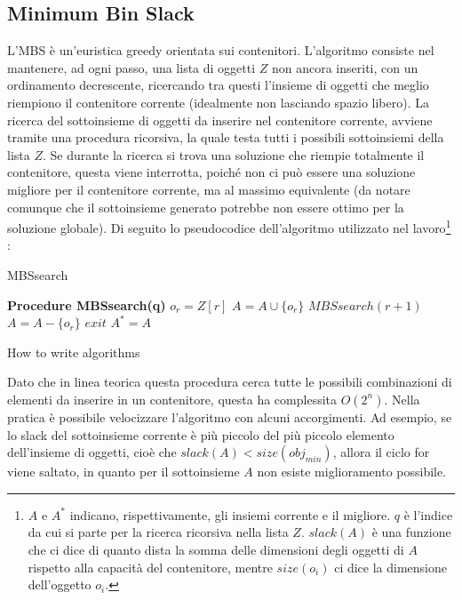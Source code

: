 \documentclass{article}
\begin{document}
\subsection{Minimum Bin Slack}
L'MBS è un'euristica greedy orientata sui contenitori. L'algoritmo consiste nel mantenere, ad ogni passo, una lista di oggetti $Z$ non ancora inseriti, con un ordinamento decrescente, ricercando tra questi l'insieme di oggetti che meglio riempiono il contenitore corrente (idealmente non lasciando spazio libero).
\newline
\newline
La ricerca del sottoinsieme di oggetti da inserire nel contenitore corrente, avviene tramite una procedura ricorsiva, la quale testa tutti i possibili sottoinsiemi della lista $Z$. Se durante la ricerca si trova una soluzione che riempie totalmente il contenitore, questa viene interrotta, poiché non ci può essere una soluzione migliore per il contenitore corrente, ma al massimo equivalente (da notare comunque che il sottoinsieme generato potrebbe non essere ottimo per la soluzione globale). 
\newpage
Di seguito lo pseudocodice dell'algoritmo utilizzato nel lavoro\footnote{$A$ e $A^*$ indicano, rispettivamente, gli insiemi corrente e il migliore. $q$ è l'indice da cui si parte per la ricerca ricorsiva nella lista $Z$. $slack(A)$ è una funzione che ci dice di quanto dista la somma delle dimensioni degli oggetti di $A$ rispetto alla capacità del contenitore, mentre $size(o_i)$ ci dice la dimensione dell'oggetto $o_i$.} :
\begin{algorithm}[h]
\caption{MBSsearch}
\label{MBSsearch}
\begin{algorithmic}[2]
\State \textbf{Procedure MBSsearch(q)}
\State $o_{r} = Z[r]$
\State $A = A \cup \{o_{r}\}$
\State $MBSsearch(r+1)$
\State $A = A - \{o_{r}\}$
\State $exit$
\EndIf
{}
\EndIf 
{}
\EndFor
{}
\State $A^* = A$
\EndIf
{}
\caption{How to write algorithms}
\end{algorithmic}
\end{algorithm}
\newline
\newline
Dato che in linea teorica questa procedura cerca tutte le possibili combinazioni di elementi da inserire in un contenitore, questa ha complessita $O(2^n)$. Nella pratica è possibile velocizzare l'algoritmo con alcuni accorgimenti. Ad esempio, se lo slack del sottoinsieme corrente è più piccolo del più piccolo elemento dell'insieme di oggetti, cioè che $slack(A) < size(obj_{min})$, allora il ciclo for viene saltato, in quanto per il sottoinsieme $A$ non esiste miglioramento possibile.
\end{document}
